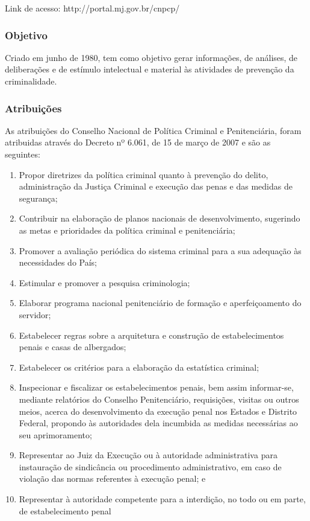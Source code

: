 Link de acesso: http://portal.mj.gov.br/cnpcp/

\subsubsection*{Objetivo}

Criado em junho de 1980, tem como objetivo gerar informações, de
análises, de deliberações e de estímulo intelectual e
material às atividades de prevenção da criminalidade.

\subsubsection*{Atribuições}


As atribuições do Conselho Nacional de Política Criminal e
Penitenciária, foram atribuidas através do Decreto
nº 6.061, de 15 de março de 2007 e são as
seguintes:

\begin{enumerate}
\item 
Propor diretrizes da política criminal quanto à prevenção do
delito, administração da Justiça Criminal e execução
das penas e das medidas de segurança;
\item 
Contribuir na elaboração de planos nacionais de desenvolvimento,
sugerindo as metas e prioridades da política criminal e
penitenciária;
\item 
Promover a avaliação periódica do sistema criminal para a sua
adequação às necessidades do País;
\item 
Estimular e promover a pesquisa criminologia;
\item 
Elaborar programa nacional penitenciário de formação e
aperfeiçoamento do servidor;
\item 
Estabelecer regras sobre a arquitetura e construção de
estabelecimentos penais e casas de albergados;
\item 
Estabelecer os critérios para a elaboração da estatística
criminal;
\item 
Inspecionar e fiscalizar os estabelecimentos penais, bem assim
informar-se, mediante relatórios do Conselho Penitenciário,
requisições, visitas ou outros meios, acerca do desenvolvimento
da execução penal nos Estados e Distrito Federal, propondo às
autoridades dela incumbida as medidas necessárias ao seu
aprimoramento;
\item 
Representar ao Juiz da Execução ou à autoridade administrativa
para instauração de sindicância ou procedimento administrativo,
em caso de violação das normas referentes à execução
penal; e
\item 
Representar à autoridade competente para a interdição, no todo
ou em parte, de estabelecimento penal
\end{enumerate}

